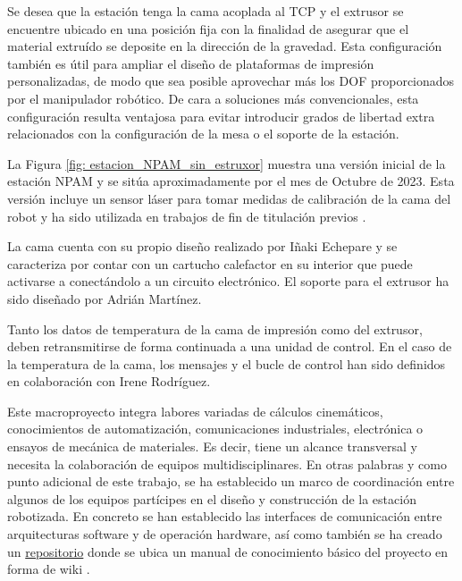 Se desea que la estación tenga la cama acoplada al \acrshort{TCP} y el extrusor se encuentre ubicado en una posición fija con la finalidad de asegurar que el material extruído se deposite en la dirección de la gravedad. Esta configuración también es útil para ampliar el diseño de plataformas de impresión personalizadas, de modo que sea posible aprovechar más los \acrshort{DOF} proporcionados por el manipulador robótico. De cara a soluciones más convencionales, esta configuración resulta ventajosa para evitar introducir grados de libertad extra relacionados con la configuración de la mesa o el soporte de la estación. 

La Figura \ref{fig: estacion_NPAM_sin_estruxor} muestra una versión inicial de la estación \acrshort{NPAM} y se sitúa aproximadamente por el mes de Octubre de 2023. Esta versión incluye un sensor láser para tomar medidas de calibración de la cama del robot y ha sido utilizada en trabajos de fin de titulación previos \cite{TFM_SanchoAmparo} \cite{TFM_Lu}.

La cama cuenta con su propio diseño realizado por Iñaki Echepare \cite{TFM_IñakiEchepare} y se caracteriza por contar con un cartucho calefactor en su interior que puede activarse a conectándolo a un circuito electrónico. El soporte para el extrusor ha sido diseñado por Adrián Martínez. 

Tanto los datos de temperatura de la cama de impresión como del extrusor, deben retransmitirse de forma continuada a una unidad de control. En el caso de la temperatura de la cama, los mensajes y el bucle de control han sido definidos en colaboración con Irene Rodríguez.

Este macroproyecto integra labores variadas de cálculos cinemáticos, conocimientos de automatización, comunicaciones industriales, electrónica o ensayos de mecánica de materiales. Es decir, tiene un alcance transversal y necesita la colaboración de equipos multidisciplinares. En otras palabras y como punto adicional de este trabajo, se ha establecido un marco de coordinación entre algunos de los equipos partícipes en el diseño y construcción de la estación robotizada. En concreto se han establecido las interfaces de comunicación entre arquitecturas software y de operación hardware, así como también se ha creado un \href{\linkrepositorio}{repositorio} donde se ubica un manual de conocimiento básico del proyecto en forma de wiki  \cite{repo_github_TFM_MiguelLerinAlonso}.

